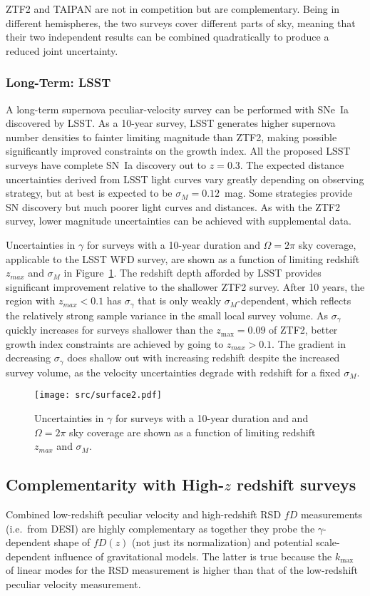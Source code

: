 ZTF2 and TAIPAN are not in competition but are complementary.  Being in different hemispheres, the two surveys
cover different parts of sky, meaning that their two independent results can be
combined  quadratically to produce a reduced joint uncertainty. 

\subsubsection{Long-Term: LSST}
A long-term supernova peculiar-velocity survey can be performed with SNe~Ia discovered by LSST.
As a 10-year survey, LSST generates higher supernova number densities to fainter limiting magnitude than  ZTF2,
making possible significantly improved constraints on the growth index.
All the proposed LSST surveys have complete SN~Ia discovery out to $z=0.3$.
The expected distance uncertainties derived from LSST light curves vary greatly depending on observing strategy, but at best
is expected to be $\sigma_M=0.12$~mag. Some strategies provide SN discovery but much poorer light curves
and distances.   As with the ZTF2 survey,  lower magnitude uncertainties
can be achieved with supplemental data.

Uncertainties in $\gamma$ for surveys with a 10-year duration   and $\Omega=2\pi$ sky coverage, applicable to the LSST WFD survey, 
are shown as a function of limiting  redshift $z_{max}$ and $\sigma_M$ in Figure~\ref{lsst:fig}.
The redshift depth afforded by LSST provides significant improvement relative to the shallower ZTF2 survey.
After 10 years, the region with $z_{max}<0.1$ has $\sigma_\gamma$ that is only weakly $\sigma_M$-dependent, 
which reflects the relatively strong sample variance in the small local survey volume.  
As $\sigma_\gamma$ quickly increases for surveys shallower than the $z_{\text{max}}=0.09$ 
of ZTF2,
better growth index constraints
are achieved by going to $z_{max}>0.1$.
The gradient in decreasing $\sigma_\gamma$ does shallow out with increasing redshift despite the increased survey volume, 
as the velocity uncertainties degrade with redshift for a fixed $\sigma_M$.

\begin{figure}
\centering
\texttt{[image: src/surface2.pdf]}
\caption{Uncertainties in $\gamma$ for surveys with a 10-year duration and  and $\Omega=2\pi$ sky coverage 
are shown as a function of limiting  redshift $z_{max}$ and $\sigma_M$.
\label{lsst:fig}}
\end{figure}

\subsection{Complementarity with High-$z$ redshift surveys}
Combined low-redshift peculiar velocity and high-redshift RSD $fD$ measurements (i.e.\ from DESI) are highly complementary as together they probe the
$\gamma$-dependent shape of $fD(z)$ (not just its normalization) and potential scale-dependent influence of gravitational models.  
The latter is true because 
the $k_{\text{max}}$ of linear modes for the RSD measurement is higher than that of the low-redshift peculiar velocity measurement.


